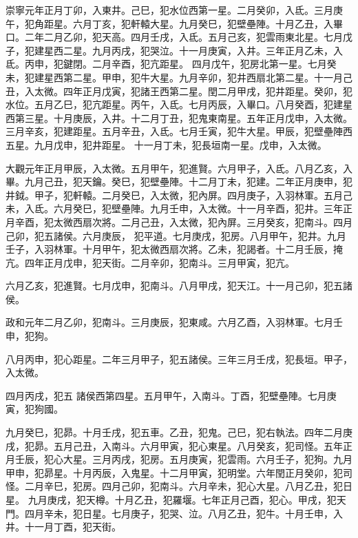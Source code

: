 \begin{pinyinscope}
 崇寧元年正月丁卯，入東井。己巳，犯水位西第一星。二月癸卯，入氐。三月庚午，犯角距星。六月丁亥，犯軒轅大星。九月癸巳，犯壁壘陣。十月乙丑，入畢口。二年二月乙卯，犯天高。四月壬戌，入氐。五月己亥，犯雲雨東北星。七月戊子，犯建星西二星。九月丙戌，犯哭泣。十一月庚寅，入井。三年正月乙未，入氐。丙申，犯鍵閉。二月辛酉，犯亢距星。
 四月戊午，犯房北第一星。七月癸未，犯建星西第二星。甲申，犯牛大星。九月辛卯，犯井西扇北第二星。十一月己丑，入太微。四年正月戊寅，犯諸王西第二星。閏二月甲戌，犯井距星。癸卯，犯水位。五月乙巳，犯亢距星。丙午，入氐。七月丙辰，入畢口。八月癸酉，犯建星西第三星。十月庚辰，入井。十二月丁丑，犯鬼東南星。五年正月戊申，入太微。三月辛亥，犯建距星。五月辛丑，入氐。七月壬寅，犯牛大星。甲辰，犯壁壘陣西五星。九月戊申，犯井距星。
 十一月丁未，犯長垣南一星。戊申，入太微。



 大觀元年正月甲辰，入太微。五月甲午，犯進賢。六月甲子，入氐。八月乙亥，入畢。九月己丑，犯天鑰。癸巳，犯壁壘陣。十二月丁未，犯建。二年正月庚申，犯井鉞。甲子，犯軒轅。二月癸巳，入太微，犯內屏。四月庚子，入羽林軍。五月己未，入氐。六月癸巳，犯壁壘陣。九月壬申，入太微。十一月辛酉，犯井。三年正月辛酉，犯太微西扇次將。二月己丑，入太微，犯內屏。三月癸亥，犯南斗。四月己卯，犯五諸侯。六月庚辰，
 犯平道。七月庚戌，犯房。八月甲午，犯井。九月壬子，入羽林軍。十月甲午，犯太微西扇次將。乙未，犯謁者。十二月壬辰，掩亢。四年正月戊申，犯天街。二月辛卯，犯南斗。三月甲寅，犯亢。



 六月乙亥，犯進賢。七月戊申，犯南斗。八月甲戌，犯天江。十一月己卯，犯五諸侯。



 政和元年二月乙卯，犯南斗。三月庚辰，犯東咸。六月乙酉，入羽林軍。七月壬申，犯狗。



 八月丙申，犯心距星。二年三月甲子，犯五諸侯。三年三月壬戌，犯長垣。甲子，入太微。



 四月丙戌，犯五
 諸侯西第四星。五月甲午，入南斗。丁酉，犯壁壘陣。七月庚寅，犯狗國。



 九月癸巳，犯昴。十月壬戌，犯五車。乙丑，犯鬼。己巳，犯右執法。四年二月庚戌，犯昴。五月己丑，入南斗。六月甲寅，犯心東星。八月癸亥，犯司怪。五年正月壬辰，犯心大星。三月丙戌，犯房。五月庚寅，犯雲雨。六月壬子，犯狗。九月甲申，犯昴星。十月丙辰，入鬼星。十二月甲寅，犯明堂。六年閏正月癸卯，犯司怪。二月辛巳，犯房。四月己卯，犯南斗。六月辛未，犯心大星。八月乙丑，犯日星。
 九月庚戌，犯天樽。十月乙丑，犯羅堰。七年正月己酉，犯心。甲戌，犯天門。四月辛未，犯日星。七月庚子，犯哭、泣。八月乙丑，犯牛。十月壬申，入井。十一月丁酉，犯天街。




\end{pinyinscope}
